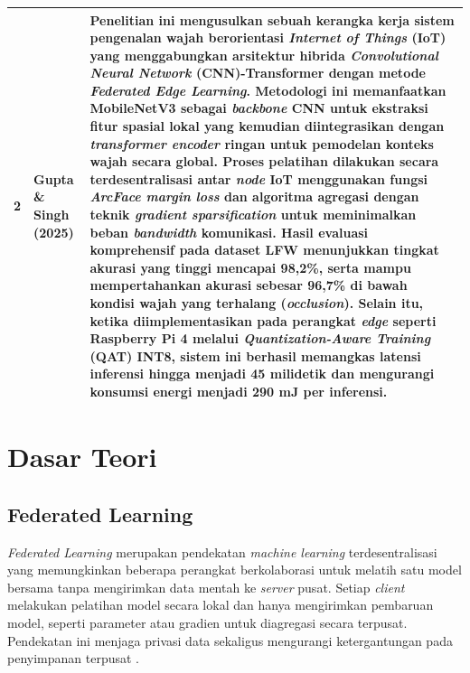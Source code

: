 \begin{longtable}{|c|p{4.5cm}|p{8.5cm}|}
  2 & Gupta \& Singh (2025) \parencite{Gupta2025} & Penelitian ini mengusulkan sebuah kerangka kerja sistem pengenalan wajah berorientasi \textit{Internet of Things} (IoT) yang menggabungkan arsitektur hibrida \textit{Convolutional Neural Network} (CNN)-Transformer dengan metode \textit{Federated Edge Learning}. Metodologi ini memanfaatkan MobileNetV3 sebagai \textit{backbone} CNN untuk ekstraksi fitur spasial lokal yang kemudian diintegrasikan dengan \textit{transformer encoder} ringan untuk pemodelan konteks wajah secara global. Proses pelatihan dilakukan secara terdesentralisasi antar \textit{node} IoT menggunakan fungsi \textit{ArcFace margin loss} dan algoritma agregasi dengan teknik \textit{gradient sparsification} untuk meminimalkan beban \textit{bandwidth} komunikasi. Hasil evaluasi komprehensif pada dataset LFW menunjukkan tingkat akurasi yang tinggi mencapai 98,2\%, serta mampu mempertahankan akurasi sebesar 96,7\% di bawah kondisi wajah yang terhalang (\textit{occlusion}). Selain itu, ketika diimplementasikan pada perangkat \textit{edge} seperti Raspberry Pi 4 melalui \textit{Quantization-Aware Training} (QAT) INT8, sistem ini berhasil memangkas latensi inferensi hingga menjadi 45 milidetik dan mengurangi konsumsi energi menjadi 290 mJ per inferensi. \\
  \hline
\end{longtable}

\section{Dasar Teori}
\label{sec:dasar-teori}

\subsection{Federated Learning}
\label{subsec:federated-learning-teori}

\textit{Federated Learning} merupakan pendekatan \textit{machine learning} terdesentralisasi yang memungkinkan beberapa perangkat berkolaborasi untuk melatih satu model bersama tanpa mengirimkan data mentah ke \textit{server} pusat. Setiap \textit{client} melakukan pelatihan model secara lokal dan hanya mengirimkan pembaruan model, seperti parameter atau gradien untuk diagregasi secara terpusat. Pendekatan ini menjaga privasi data sekaligus mengurangi ketergantungan pada penyimpanan terpusat \parencite{Shaheen2022}.

